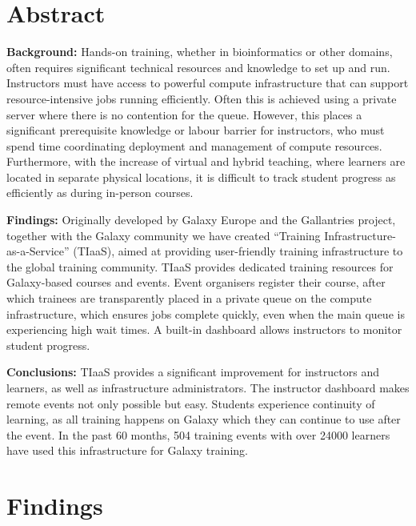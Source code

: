 \section*{Abstract}
\textbf{Background:} Hands-on training, whether in bioinformatics or other domains, often requires significant technical resources and knowledge to set up and run.
Instructors must have access to powerful compute infrastructure that can support resource-intensive jobs running efficiently.
Often this is achieved using a private server where there is no contention for the queue. However, this places a significant prerequisite knowledge or labour barrier for instructors, who must spend time coordinating deployment and management of compute resources. Furthermore, with the increase of virtual and hybrid teaching, where learners are located in separate physical locations, it is difficult to track student progress as efficiently as during in-person courses.

\textbf{Findings:} Originally developed by Galaxy Europe and the Gallantries project, together with the Galaxy community we have created ``Training Infrastructure-as-a-Service'' (TIaaS), aimed at providing user-friendly training infrastructure to the global training community. TIaaS provides dedicated training resources for Galaxy-based courses and events. Event organisers register their course, after which trainees are transparently placed in a private queue on the compute infrastructure, which ensures jobs complete quickly, even when the main queue is experiencing high wait times. A built-in dashboard allows instructors to monitor student progress.

\textbf{Conclusions:} TIaaS provides a significant improvement for instructors and learners, as well as infrastructure administrators. The instructor dashboard makes remote events not only possible but easy. Students experience continuity of learning, as all training happens on Galaxy which they can continue to use after the event. In the past 60 months, 504 training events with over 24000 learners have used this infrastructure for Galaxy training.

\section*{Findings}
